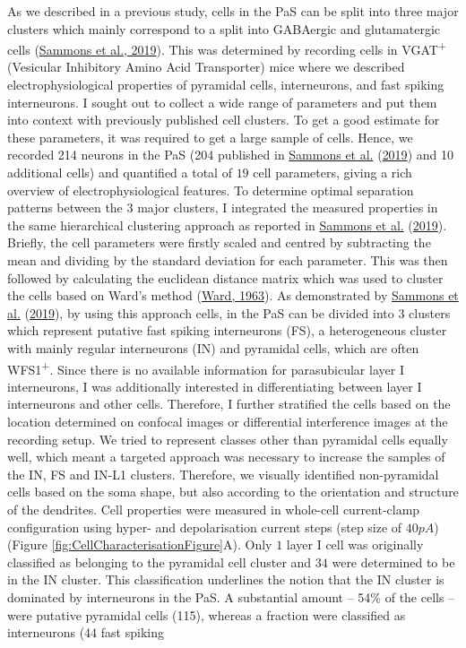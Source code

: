 \documentclass[
  12pt,
  a4paper,
  openany]{book}
\begin{document}
As we described in a previous study, cells in the PaS can be split into three major clusters which mainly correspond to a split into GABAergic and glutamatergic cells (\protect\hyperlink{ref-sammons_electrophysiological_2019}{Sammons et al., 2019}). This was determined by recording cells in VGAT\textsuperscript{+} (Vesicular Inhibitory Amino Acid Transporter) mice where we described electrophysiological properties of pyramidal cells, interneurons, and fast spiking interneurons. I sought out to collect a wide range of parameters and put them into context with previously published cell clusters. To get a good estimate for these parameters, it was required to get a large sample of cells. Hence, we recorded 214 neurons in the PaS (204 published in \protect\hyperlink{ref-sammons_electrophysiological_2019}{Sammons et al.} (\protect\hyperlink{ref-sammons_electrophysiological_2019}{2019}) and 10 additional cells) and quantified a total of \(19\) cell parameters, giving a rich overview of electrophysiological features. To determine optimal separation patterns between the \(3\) major clusters, I integrated the measured properties in the same hierarchical clustering approach as reported in \protect\hyperlink{ref-sammons_electrophysiological_2019}{Sammons et al.} (\protect\hyperlink{ref-sammons_electrophysiological_2019}{2019}). Briefly, the cell parameters were firstly scaled and centred by subtracting the mean and dividing by the standard deviation for each parameter. This was then followed by calculating the euclidean distance matrix which was used to cluster the cells based on Ward's method (\protect\hyperlink{ref-ward_hierarchical_1963}{Ward, 1963}). As demonstrated by \protect\hyperlink{ref-sammons_electrophysiological_2019}{Sammons et al.} (\protect\hyperlink{ref-sammons_electrophysiological_2019}{2019}), by using this approach cells, in the PaS can be divided into \(3\) clusters which represent putative fast spiking interneurons (FS), a heterogeneous cluster with mainly regular interneurons (IN) and pyramidal cells, which are often WFS1\textsuperscript{+}. Since there is no available information for parasubicular layer I interneurons, I was additionally interested in differentiating between layer I interneurons and other cells. Therefore, I further stratified the cells based on the location determined on confocal images or differential interference images at the recording setup. We tried to represent classes other than pyramidal cells equally well, which meant a targeted approach was necessary to increase the samples of the IN, FS and IN-L1 clusters. Therefore, we visually identified non-pyramidal cells based on the soma shape, but also according to the orientation and structure of the dendrites. Cell properties were measured in whole-cell current-clamp configuration using hyper- and depolarisation current steps (step size of \(40pA\)) (Figure \ref{fig:CellCharacterisationFigure}A). Only \(1\) layer I cell was originally classified as belonging to the pyramidal cell cluster and \(34\) were determined to be in the IN cluster. This classification underlines the notion that the IN cluster is dominated by interneurons in the PaS. A substantial amount -- 54\% of the cells -- were putative pyramidal cells (115), whereas a fraction were classified as interneurons (44 fast spiking 
\end{document}
